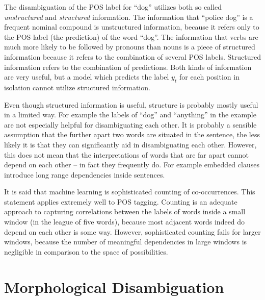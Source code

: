 The disambiguation of the POS label for ``dog'' utilizes both so
called {\it unstructured} and {\it structured} information. The
information that ``police dog'' is a frequent nominal compound is
unstructured information, because it refers only to the POS label (the
prediction) of the word ``dog''. The information that verbs are much
more likely to be followed by pronouns than nouns is a piece of
structured information because it refers to the combination of several
POS labels. Structured information refers to the combination of
predictions. Both kinds of information are very useful, but a model
which predicts the label $y_t$ for each position in isolation cannot
utilize structured information.

Even though structured information is useful, structure is probably
mostly useful in a limited way. For example the labels of ``dog'' and
``anything'' in the example are not especially helpful for
disambiguating each other. It is probably a sensible assumption that
the further apart two words are situated in the sentence, the less
likely it is that they can significantly aid in disambiguating each
other. However, this does not mean that the interpretations of words
that are far apart cannot depend on each other -- in fact they
frequently do. For example embedded clauses introduce long range
dependencies inside sentences.

It is said that machine learning is sophisticated counting of
co-occurrences. This statement applies extremely well to POS
tagging. Counting is an adequate approach to capturing correlations
between the labels of words inside a small window (in the league of
five words), because most adjacent words indeed do depend on each
other is some way. However, sophisticated counting fails for larger
windows, because the number of meaningful dependencies in large
windows is negligible in comparison to the space of possibilities.


\section{Morphological Disambiguation}
